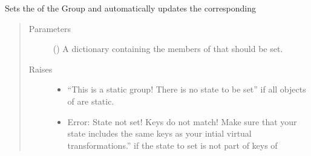 \documentclass[letterpaper,10pt,english]{sphinxmanual}
\begin{document}
\begin{fulllineitems}
\begin{fulllineitems}
\label{\detokenize{code_docu:trip_kinematics.KinematicGroup.KinematicGroup.set_actuated_state}}
Sets the  of the Group and automatically updates the corresponding 
\begin{quote}\begin{description}
\item[{Parameters}] \leavevmode
{} (\sphinxstyleliteralemphasis{\sphinxupquote{{[}}}\sphinxstyleliteralemphasis{\sphinxupquote{, }}\sphinxstyleliteralemphasis{\sphinxupquote{{]}}}) \textendash{} A dictionary containing the members of  that should be set.

\item[{Raises}] \leavevmode\begin{itemize}
\item {} 
 \textendash{} “This is a static group! There is no state to be set” if all  {\hyperref[\detokenize{code_docu:trip_kinematics.KinematicGroup.Transformation}]{}} objects of  are static.

\item {} 
 \textendash{} Error: State not set! Keys do not match! Make sure that your state includes the same keys as your intial virtual transformations.”
    if the state to set is not part of keys of 

\end{itemize}

\end{description}\end{quote}

\end{fulllineitems}



\end{fulllineitems}
\end{document}
